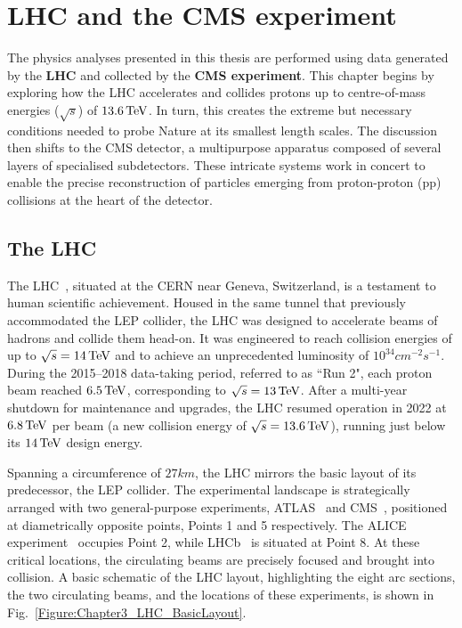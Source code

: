 \chapter{LHC and the CMS experiment}
\thispagestyle{plain}  %
\pagestyle{chapterpages}
\label{Section:Chapter3}

\minitoc

The physics analyses presented in this thesis are performed using data generated by the \textbf{LHC} and collected by the \textbf{\ac{CMS} experiment}. This chapter begins by exploring how the LHC accelerates and collides protons up to centre-of-mass energies ($\sqrt{s}$) of $13.6\,\text{Te\hspace{-.08em}V}$. In turn, this creates the extreme but necessary conditions needed to probe Nature at its smallest length scales. The discussion then shifts to the CMS detector, a multipurpose apparatus composed of several layers of specialised subdetectors. These intricate systems work in concert to enable the precise reconstruction of particles emerging from proton-proton (pp) collisions at the heart of the detector.

\section{The LHC}
\label{Section:Chapter3_LHC}
The LHC~\cite{LHC_1}, situated at the \ac{CERN} near Geneva, Switzerland, is a testament to human scientific achievement. Housed in the same tunnel that previously accommodated the \ac{LEP} collider, the LHC was designed to accelerate beams of hadrons and collide them head-on. It was engineered to reach collision energies of up to $\sqrt{s} = 14\,\text{Te\hspace{-.08em}V}$ and to achieve an unprecedented luminosity of $10^{34}\unit{cm}^{-2}\unit{s}^{-1}$. During the 2015–2018 data-taking period, referred to as ``Run 2", each proton beam reached $6.5\,\text{Te\hspace{-.08em}V}$, corresponding to $\sqrt{s}=13\,\text{Te\hspace{-.08em}V}$. After a multi-year shutdown for maintenance and upgrades, the LHC resumed operation in 2022 at $6.8\,\text{Te\hspace{-.08em}V}$ per beam (a new collision energy of $\sqrt{s}=13.6\,\text{Te\hspace{-.08em}V}$), running just below its $14\,\text{Te\hspace{-.08em}V}$ design energy. 

Spanning a circumference of $27\unit{km}$, the LHC mirrors the basic layout of its predecessor, the LEP collider. The experimental landscape is strategically arranged with two general-purpose experiments, ATLAS~\cite{LHC_ATLAS} and CMS~\cite{LHC_CMS}, positioned at diametrically opposite points, Points 1 and 5 respectively. The ALICE experiment~\cite{LHC_ALICE} occupies Point 2, while LHCb~\cite{LHC_LCHb} is situated at Point 8. At these critical locations, the circulating beams are precisely focused and brought into collision. A basic schematic of the LHC layout, highlighting the eight arc sections, the two circulating beams, and the locations of these experiments, is shown in Fig.~\ref{Figure:Chapter3_LHC_BasicLayout}.

